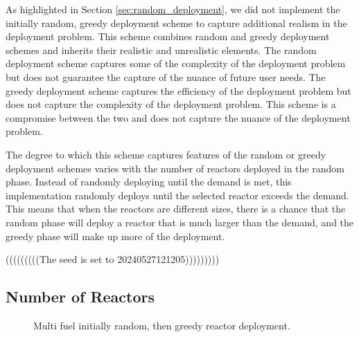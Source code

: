 As highlighted in Section \ref{sec:random_deployment}, we did not implement the
initially random, greedy deployment scheme to capture additional realism in the
deployment problem. This scheme combines random and greedy deployment schemes
and inherits their realistic and unrealistic elements. The random deployment
scheme captures some of the complexity of the deployment problem but does not
guarantee the capture of the nuance of future user needs. The greedy deployment
scheme captures the efficiency of the deployment problem but does not capture
the complexity of the deployment problem. This scheme is a compromise between
the two and does not capture the nuance of the deployment problem.

The degree to which this scheme captures features of the random or greedy
deployment schemes varies with the number of reactors deployed in the random
phase. Instead of randomly deploying until the demand is met, this
implementation randomly deploys until the selected reactor exceeds the demand.
This means that when the reactors are different sizes, there is a chance that
the random phase will deploy a reactor that is much larger than the demand, and
the greedy phase will make up more of the deployment.


(((((((((The seed is set to 20240527121205)))))))))


\subsection{Number of Reactors}


\begin{figure}[H]
    \hfill
    \caption{Multi fuel initially random, then greedy reactor deployment.}
    \label{fig:rand_greed_mf_reactors}
  \end{figure}

